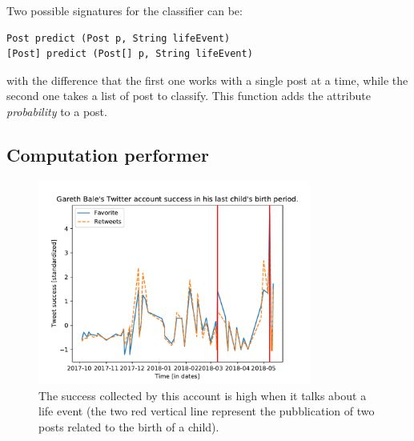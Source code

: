 Two possible signatures for the classifier can be:
\begin{Verbatim}
Post predict (Post p, String lifeEvent)
[Post] predict (Post[] p, String lifeEvent)
\end{Verbatim}
with the difference that the first one works with a single post at a time, while the second one takes a list of post to classify. This function adds the attribute \textit{probability} to a post.

\subsection{Computation performer}
\label{sec:computationperformer}

\begin{figure}
\centering
\includegraphics[width=%
0.8\textwidth]{img/bale}
\caption{The success collected by this account is high when it talks about a life event (the two red vertical line represent the pubblication of two posts related to the birth of a child).}
\label{fig:bale}
\end{figure}

